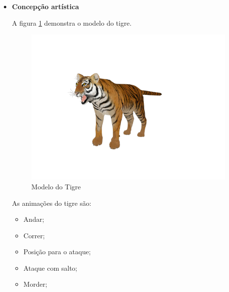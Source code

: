 \begin{itemize}
\item {\bf Concepção artística}

A figura \ref{img:tigre} demonstra o modelo do tigre.
\newpage
\begin{figure}[ht]
 \centering
 \includegraphics[scale=0.3]{Imagens/tigre01.png}
 \caption{Modelo do Tigre}
\label{img:tigre}
\end{figure}

As animações do tigre são:
\begin{itemize}
\item {Andar;}
\item {Correr;}
\item {Posição para o ataque;}
\item {Ataque com salto;}
\item {Morder;}
\end{itemize}
\end{itemize}

